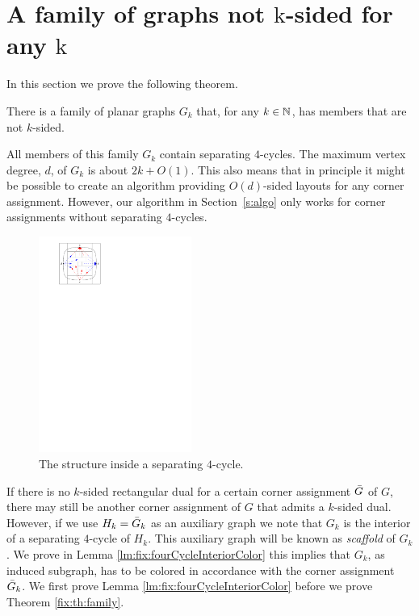 
\section{A family of graphs not $\mathrm{k}$-sided for any $\mathrm{k}$}
\thispagestyle{plain}
  \label{s:fix}
  In this section we prove the following theorem.

  \begin{thrm}
    \label{fix:th:family}
      There is a family of planar graphs $G_k$ that, for any $k \in \mathbb{N}$, has members that are not $k$-sided.
  \end{thrm}

  All members of this family $G_k$ contain separating $4$-cycles.
  The maximum vertex degree, $d$, of $G_k$ is about $2k+O(1)$. This also means that in principle it might be possible to create an algorithm providing $O(d)$-sided layouts for any corner assignment. However, our algorithm in Section~\ref{s:algo} only works for corner assignments without separating $4$-cycles.

  \begin{figure}
    \centering
    \includegraphics[width=5cm]{fixExtension/img/sep4cycle.pdf}
    \caption{The structure inside a separating $4$-cycle.}
    \label{fig:fix:sep4cycle}
  \end{figure}

  If there is no $k$-sided rectangular dual for a certain corner assignment $\bar{G}$ of $G$, there may still be another corner assignment of $G$ that admits a $k$-sided dual.
  However, if we use $ H_k = \bar{G}_k$ as an auxiliary graph we note that $G_k$ is the interior of a separating $4$-cycle of $H_k$. This auxiliary graph will be known as \emph{scaffold} of $G_k$.
  We prove in Lemma \ref{lm:fix:fourCycleInteriorColor} this implies that $G_k$, as induced subgraph, has to be colored in accordance with the corner assignment $\bar{G}_k$.
  We first prove Lemma \ref{lm:fix:fourCycleInteriorColor} before we prove Theorem \ref{fix:th:family}.

